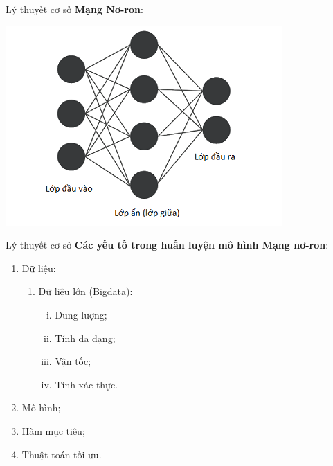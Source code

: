 \documentclass[notheorems,hyperref={bookmarks=true}]{beamer}
\theoremstyle{plain}
\numberwithin{equation}{section}
\begin{document}
\begin{footnotesize}
\begin{frame}{Lý thuyết cơ sở}
\textbf{Mạng Nơ-ron}: 
\begin{center}
\includegraphics[scale=0.6]{ANN.png}
\end{center}
\end{frame}

\begin{frame}{Lý thuyết cơ sở}
\textbf{Các yếu tố trong huấn luyện mô hình Mạng nơ-ron}: \pause
\begin{enumerate}[-]
	\item Dữ liệu: \pause
	\begin{enumerate}[+]
		\item Dữ liệu lớn (Bigdata):
		\begin{enumerate}[i.]
			\item Dung lượng;
			\item Tính đa dạng;
			\item Vận tốc;
			\item Tính xác thực.\pause
		\end{enumerate}
	\end{enumerate}
	\item Mô hình;\pause
	\item Hàm mục tiêu;\pause
	\item Thuật toán tối ưu.
\end{enumerate}
\end{frame}


\end{footnotesize}
\end{document}
